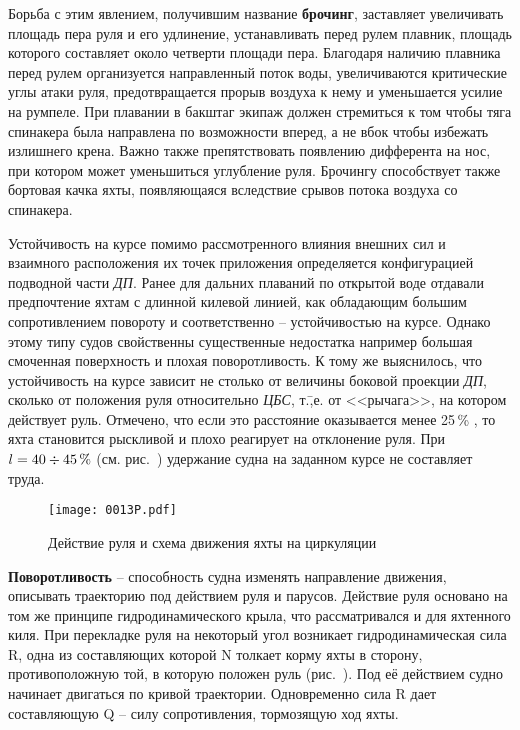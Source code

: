 Борьба с этим явлением, получившим название \textbf{брочинг}, заставляет увеличивать площадь пера руля и его удлинение, устанавливать перед рулем плавник, площадь которого составляет около четверти площади пера. Благодаря наличию плавника перед рулем организуется направленный поток воды, увеличиваются критические углы атаки руля, предотвращается прорыв воздуха к нему и уменьшается усилие на румпеле. При плавании в бакштаг экипаж должен стремиться к том чтобы тяга спинакера была направлена по возможности вперед, а не вбок чтобы избежать излишнего крена. Важно также препятствовать появлению дифферента на нос, при котором может уменьшиться углубление руля. Брочингу способствует также бортовая качка яхты, появляющаяся вследствие срывов потока воздуха со спинакера.

Устойчивость на курсе помимо рассмотренного влияния внешних сил и взаимного расположения их точек приложения определяется конфигурацией подводной части \textit{ДП}. Ранее для дальних плаваний по открытой воде отдавали предпочтение яхтам с длинной килевой линией, как обладающим большим сопротивлением повороту и соответственно \--- устойчивостью на курсе. Однако этому типу судов свойственны существенные недостатка например большая смоченная поверхность и плохая поворотливость. К тому же выяснилось, что устойчивость на курсе зависит не столько от величины боковой проекции \textit{ДП}, сколько от положения руля относительно \textit{ЦБС}, т.\=,е. от <<рычага>>, на котором действует руль. Отмечено, что если это расстояние оказывается менее 25\,\% \lkvl, то яхта становится рыскливой и плохо реагирует на отклонение руля. При $l = 40 \div 45\,\%$ \lkvl (см. рис.~) удержание судна на заданном курсе не составляет труда.

\begin{figure*}[htb]
  \centering
  \texttt{[image: 0013P.pdf]}
  \caption{Действие руля и схема движения яхты на циркуляции}
  \label{fig:13}
\end{figure*}

\textbf{Поворотливость} \--- способность судна изменять направление движения, описывать траекторию под действием руля и парусов. Действие руля основано на том же принципе гидродинамического крыла, что рассматривался и для яхтенного киля. При перекладке руля на некоторый угол возникает гидродинамическая сила \ve R, одна из составляющих которой \ve N толкает корму яхты в сторону, противоположную той, в которую положен руль (рис.~). Под её действием судно начинает двигаться по кривой траектории. Одновременно сила \ve R дает составляющую \ve Q \--- силу сопротивления, тормозящую ход яхты.

